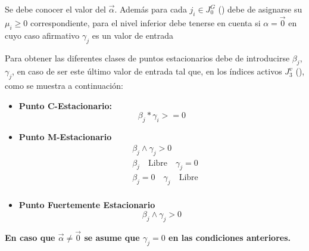 Se debe conocer el valor del $\vec{\alpha}$. 
Además para cada $j_i \in J_0^G$ () debe de asignarse su $\mu_i \geq 0$ correspondiente,
para el nivel inferior debe tenerse en cuenta si $\alpha=\vec{0}$ en cuyo caso afirmativo $\gamma_j$ es un valor de entrada

\begin{samepage}
Para obtener las diferentes clases de puntos estacionarios debe de introducirse $\beta_j$, $\gamma_j$, en caso de ser este último valor de entrada tal que, en los índices activos $J_3^v$ (), como se muestra a continuación: 
\begin{itemize}
    \item \textbf{Punto C-Estacionario:}\\
    \begin{equation}
        \beta_j * \gamma_i >=0
        \label{Requisitos puntos C-Estacionario}
    \end{equation}
    \item \textbf{Punto M-Estacionario}\\
    \begin{equation}
        \begin{aligned}
            &\beta_j \land \gamma_j>0\\
            &\beta_j \quad \text{Libre} \quad \gamma_j=0\\
            &\beta_j=0 \quad \gamma_j \quad \text{Libre}\\
        \end{aligned}
        \label{Requisitos puntos M-Estacionarios}
    \end{equation}
    \item \textbf{Punto Fuertemente Estacionario}\\
     \begin{equation}
        \beta_j \land \gamma_j >0
    \label{Requisitos puntos Fuertemente Estacionarios}
    \end{equation}    
\end{itemize}
\textbf{En caso que $\vec{\alpha} \neq \vec{0}$ se asume que $\gamma_j=0$ en las condiciones anteriores.}
\end{samepage}


